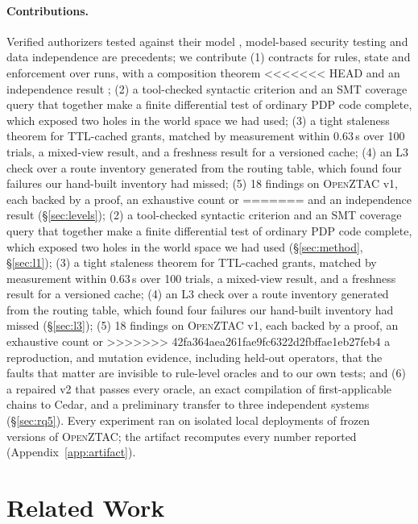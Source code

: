 \documentclass[sigconf,review,anonymous]{acmart}
\newcommand{\sysname}{\textsc{OpenZTAC}\xspace}
\newcommand{\sysname}{\textsc{Atrium}\xspace}
\newcommand{\sysname}{\textsc{OpenZTAC}\xspace}
\begin{document}
\paragraph{Contributions.} Verified authorizers tested against their model \cite{cutler2024cedar,disselkoen2024vgd},
model-based security testing \cite{mouelhi2008models} and data independence \cite{wolper1986,lazic2003semantic}
are precedents; we contribute (1) contracts for rules, state and enforcement over runs, with a composition theorem
<<<<<<< HEAD
and an independence result ; (2) a tool-checked syntactic criterion and an SMT coverage query
that together make a finite differential test of ordinary PDP code complete, which exposed two holes in the world
space we had used; (3) a tight staleness theorem for TTL-cached grants, matched
by measurement within 0.63\,s over 100 trials, a mixed-view result, and a freshness result for a versioned cache;
(4) an L3 check over a route inventory generated from the routing table, which found four failures our hand-built
inventory had missed; (5) 18 findings on \sysname v1, each backed by a proof, an exhaustive count or
=======
and an independence result (\S\ref{sec:levels}); (2) a tool-checked syntactic criterion and an SMT coverage query
that together make a finite differential test of ordinary PDP code complete, which exposed two holes in the world
space we had used (\S\ref{sec:method}, \S\ref{sec:l1}); (3) a tight staleness theorem for TTL-cached grants, matched
by measurement within 0.63\,s over 100 trials, a mixed-view result, and a freshness result for a versioned cache;
(4) an L3 check over a route inventory generated from the routing table, which found four failures our hand-built
inventory had missed (\S\ref{sec:l3}); (5) 18 findings on \sysname v1, each backed by a proof, an exhaustive count or
>>>>>>> 42fa364aea261fae9fc6322d2fbffae1eb27feb4
a reproduction, and mutation evidence, including held-out operators, that the faults that matter are invisible to
rule-level oracles and to our own tests; and (6) a repaired v2 that passes every oracle, an exact compilation of
first-applicable chains to Cedar, and a preliminary transfer to three independent systems (\S\ref{sec:rq5}). Every
experiment ran on isolated local deployments of frozen versions of \sysname; the artifact recomputes every number
reported (Appendix~\ref{app:artifact}).

\section{Related Work}
\label{sec:related}
\end{document}
